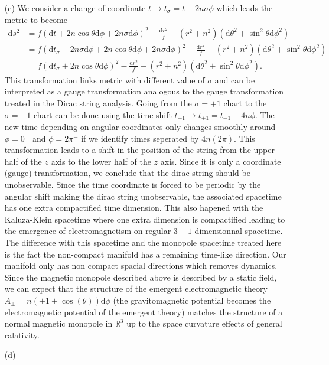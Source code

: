 \documentclass[10pt, a4paper]{article}
\begin{document}
{\begin{enumerate}
  \item[(c)] We consider a change of coordinate $t \to t_\sigma = t + 2n \sigma \phi$ which leads the metric to become
  \begin{align*}
    \text{d} s^2 &= f\left(\text{d} t + 2 n\cos \theta \text{d}\phi + 2n\sigma \text{d}\phi\right)^2-\frac{\text{d} r^2}{f}-\left(r^2+n^2\right)\left(\text{d} \theta^2+\sin ^2 \theta \text{d} \phi^2\right)\\ &=  f\left(\text{d} t_\sigma - 2n \sigma \text{d}\phi + 2 n\cos \theta \text{d}\phi + 2n\sigma \text{d}\phi \right)^2-\frac{\text{d} r^2}{f}-\left(r^2+n^2\right)\left(\text{d} \theta^2+\sin ^2 \theta \text{d} \phi^2\right)\\
    &= f\left(\text{d} t_\sigma + 2 n\cos \theta \text{d}\phi\right)^2-\frac{\text{d} r^2}{f}-\left(r^2+n^2\right)\left(\text{d} \theta^2+\sin ^2 \theta \text{d} \phi^2\right). 
  \end{align*}
  This transformation links metric with different value of $\sigma$ and can be interpreted as a gauge transformation analogous to the gauge transformation treated in the Dirac string analysis. Going from the $\sigma = +1$ chart to the $\sigma = -1$ chart can be done using the time shift $t_{-1} \to t_{+1} = t_{-1} + 4n \phi$. The new time depending on angular coordinates only changes smoothly around $\phi = 0^+$ and $\phi = 2\pi^-$ if we identify times seperated by $4n (2\pi)$. This transformation leads to a shift in the position of the string from the upper half of the $z$ axis to the lower half of the $z$ axis. Since it is only a coordinate (gauge) transformation, we conclude that the dirac string should be unobservable. Since the time coordinate is forced to be periodic by the angular shift making the dirac string unobservable, the associated spacetime has one extra compactified time dimension. This also hapened with the Kaluza-Klein spacetime where one extra dimension is compactified leading to the emergence of electromagnetism on regular $3+1$ dimensionnal spacetime. The difference with this spacetime and the monopole spacetime treated here is the fact the non-compact manifold has a remaining time-like direction. Our manifold only has non compact spacial directions which removes dynamics. Since the magnetic monopole described above is described by a static field, we can expect that the structure of the emergent electromagnetic theory $A_{\pm} = n(\pm 1 +\cos(\theta))\text{d}\phi$ (the gravitomagnetic potential becomes the electromagnetic potential of the emergent theory) matches the structure of a normal magnetic monopole in $\mathbb{R}^3$ up to the space curvature effects of general ralativity.  
  \item[(d)]
\end{enumerate}



}

\makereferences


\end{document}
